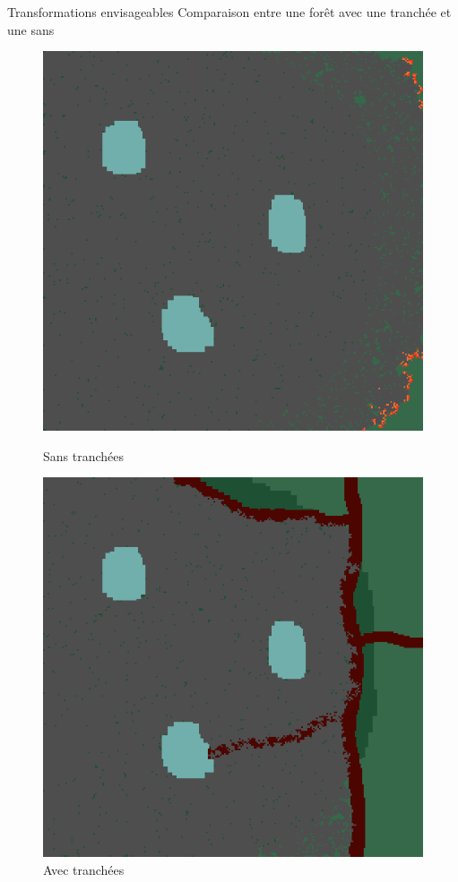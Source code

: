 \documentclass{beamer}
\begin{document}
\begin{frame}{Transformations envisageables \hyperlink{jump}{\beamerbutton{ }} \hypertarget{15}{\beamerbutton{ }}}
    Comparaison entre une forêt avec une tranchée et une sans
    
    \begin{figure}[!htb]
        \begin{minipage}{0.48\textwidth}
          \centering
          \includegraphics[width=.8\linewidth]{pictures/trans/no_treach.png}
          \caption{Sans tranchées}\label{Fig:Data1}
        \end{minipage}\hfill
        \begin{minipage}{0.48\textwidth}
          \centering
          \includegraphics[width=.8\linewidth]{pictures/trans/treach.png}
          \caption{Avec tranchées}\label{Fig:Data2}
        \end{minipage}
     \end{figure}
\end{frame}
\end{document}
